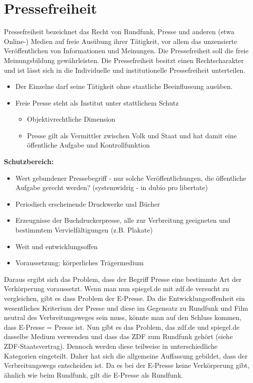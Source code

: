 \section{Pressefreiheit}
Pressefreiheit bezeichnet das Recht von Rundfunk, Presse und anderen (etwa Online-) Medien auf freie Ausübung ihrer Tätigkeit, vor allem das unzensierte Veröffentlichen von Informationen und Meinungen. Die Pressefreiheit soll die freie Meinungsbildung gewährleisten. Die Pressefreiheit besitzt einen Rechtscharakter und ist lässt sich in die Individuelle und institutionelle Pressefreiheit unterteilen. 
\begin{itemize}
	\item Der Einzelne darf seine Tätigkeit ohne staatliche Beeinflussung ausüben.
	\item Freie Presse steht als Institut unter stattlichem Schutz
	\begin{itemize}
		\item Objektivrechtliche Dimension
		\item Presse gilt als Vermittler zwischen Volk und Staat und hat damit eine öffentliche Aufgabe und Kontrollfunktion
	\end{itemize}
\end{itemize}
\textbf{Schutzbereich:}
\begin{itemize}
	\item Wert gebundener Pressebegriff - nur solche Veröffentlichungen, die öffentliche Aufgabe gerecht werden? (systemwidrig - in dubio pro libertate)
	\item Periodisch erscheinende Druckwerke und Bücher
	\item Erzeugnisse der Buchdruckerpresse, alle zur Verbreitung geeigneten und bestimmtem Vervielfältigungen (z.B. Plakate)
	\item Weit und entwicklungsoffen
	\item Voraussetzung:  körperliches Trägermedium
\end{itemize}
Daraus ergibt sich das Problem, dass der Begriff Presse eine bestimmte Art der Verkörperung voraussetzt. Wenn man nun spiegel.de mit zdf.de versucht zu vergleichen, gibt es dass Problem der E-Presse. Da die Entwicklungsoffenheit ein wesentliches Kriterium der Presse und diese im Gegensatz zu Rundfunk und Film neutral des Verbreitungsweges sein muss, könnte man auf den Schluss kommen, dass E-Presse = Presse ist. Nun gibt es das Problem, das zdf.de und spiegel.de dasselbe Medium verwenden und dass das ZDF zum Rundfunk gehört (siehe ZDF-Staatsvertrag). Dennoch werden diese teilweise in unterschiedliche Kategorien eingeteilt. Daher hat sich die allgemeine Auffassung gebildet, dass der Verbreitungswegs entscheiden ist. Da es bei der E-Presse keine Verkörperung gibt, ähnlich wie beim Rundfunk, gilt die E-Presse als Rundfunk. \\
